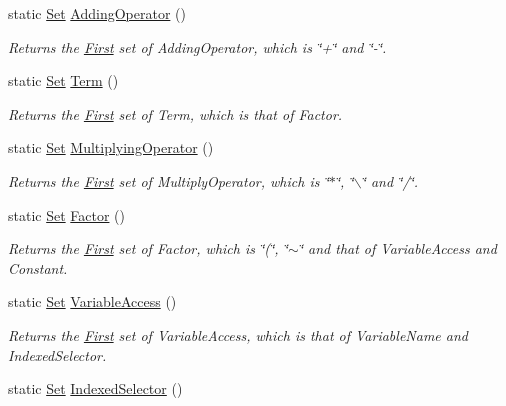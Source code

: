\begin{DoxyCompactItemize}
static \hyperlink{classSet}{Set} \hyperlink{classFirst_afd4316b16d2f0497aca2e99420d448bb}{AddingOperator} ()
\begin{DoxyCompactList}\small\item\em Returns the \hyperlink{classFirst}{First} set of AddingOperator, which is \char`\"{}+\char`\"{} and \char`\"{}-\/\char`\"{}. \item\end{DoxyCompactList}\item 
static \hyperlink{classSet}{Set} \hyperlink{classFirst_adde0c66cf7df9688ea94bfa7eec81b27}{Term} ()
\begin{DoxyCompactList}\small\item\em Returns the \hyperlink{classFirst}{First} set of Term, which is that of Factor. \item\end{DoxyCompactList}\item 
static \hyperlink{classSet}{Set} \hyperlink{classFirst_ae41a595e1322eb3995b70eddb276bb2a}{MultiplyingOperator} ()
\begin{DoxyCompactList}\small\item\em Returns the \hyperlink{classFirst}{First} set of MultiplyOperator, which is \char`\"{}$\ast$\char`\"{}, \char`\"{}$\backslash$\char`\"{} and \char`\"{}/\char`\"{}. \item\end{DoxyCompactList}\item 
static \hyperlink{classSet}{Set} \hyperlink{classFirst_ad4b339bc0b44402c2fac146afd4adeeb}{Factor} ()
\begin{DoxyCompactList}\small\item\em Returns the \hyperlink{classFirst}{First} set of Factor, which is \char`\"{}(\char`\"{}, \char`\"{}$\sim$\char`\"{} and that of VariableAccess and Constant. \item\end{DoxyCompactList}\item 
static \hyperlink{classSet}{Set} \hyperlink{classFirst_af2c57bd5207f82ae122d6177eac2d1b5}{VariableAccess} ()
\begin{DoxyCompactList}\small\item\em Returns the \hyperlink{classFirst}{First} set of VariableAccess, which is that of VariableName and IndexedSelector. \item\end{DoxyCompactList}\item 
static \hyperlink{classSet}{Set} \hyperlink{classFirst_a288f40e224fa2225533ad520baaa8575}{IndexedSelector} ()

\end{DoxyCompactItemize}
